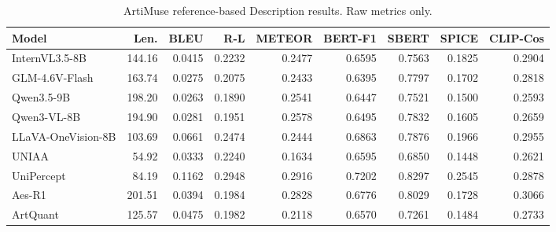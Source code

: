 \begin{table}[t]
\centering
\scriptsize
\setlength{\tabcolsep}{2.7pt}
\caption{ArtiMuse reference-based Description results. Raw metrics only.}
\begin{tabular}{lrrrrrrrr}
\toprule
Model & Len. & BLEU & R-L & METEOR & BERT-F1 & SBERT & SPICE & CLIP-Cos \\
\midrule
InternVL3.5-8B & 144.16 & 0.0415 & 0.2232 & 0.2477 & 0.6595 & 0.7563 & 0.1825 & 0.2904 \\
GLM-4.6V-Flash & 163.74 & 0.0275 & 0.2075 & 0.2433 & 0.6395 & 0.7797 & 0.1702 & 0.2818 \\
Qwen3.5-9B & 198.20 & 0.0263 & 0.1890 & 0.2541 & 0.6447 & 0.7521 & 0.1500 & 0.2593 \\
Qwen3-VL-8B & 194.90 & 0.0281 & 0.1951 & 0.2578 & 0.6495 & 0.7832 & 0.1605 & 0.2659 \\
LLaVA-OneVision-8B & 103.69 & 0.0661 & 0.2474 & 0.2444 & 0.6863 & 0.7876 & 0.1966 & 0.2955 \\
\midrule
UNIAA & 54.92 & 0.0333 & 0.2240 & 0.1634 & 0.6595 & 0.6850 & 0.1448 & 0.2621 \\
UniPercept & 84.19 & 0.1162 & 0.2948 & 0.2916 & 0.7202 & 0.8297 & 0.2545 & 0.2878 \\
Aes-R1 & 201.51 & 0.0394 & 0.1984 & 0.2828 & 0.6776 & 0.8029 & 0.1728 & 0.3066 \\
ArtQuant & 125.57 & 0.0475 & 0.1982 & 0.2118 & 0.6570 & 0.7261 & 0.1484 & 0.2733 \\
\bottomrule
\end{tabular}
\end{table}

